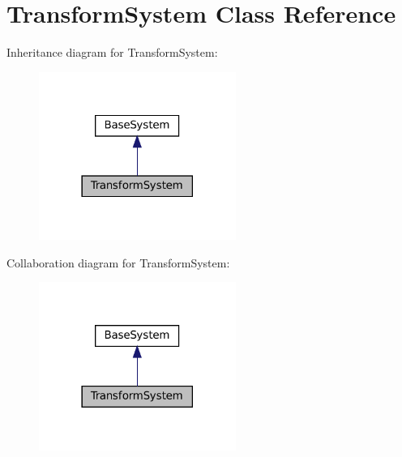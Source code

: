\hypertarget{classTransformSystem}{}\section{Transform\+System Class Reference}
\label{classTransformSystem}


Inheritance diagram for Transform\+System\+:
\nopagebreak
\begin{figure}[H]
\begin{center}
\leavevmode
\includegraphics[width=182pt]{classTransformSystem__inherit__graph}
\end{center}
\end{figure}


Collaboration diagram for Transform\+System\+:
\nopagebreak
\begin{figure}[H]
\begin{center}
\leavevmode
\includegraphics[width=182pt]{classTransformSystem__coll__graph}
\end{center}
\end{figure}
